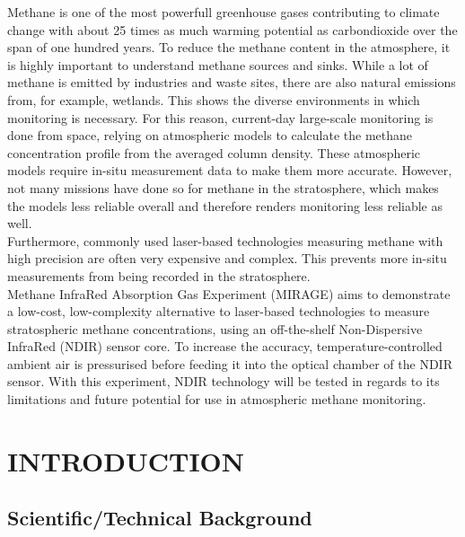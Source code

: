 \documentclass[
  a4paper,
  11pt,
  openany,
  parskip,
  toc=totoc,
  listof=totoc,
  bibliography=totoc
]{scrreprt}
\newcommand{\dos}{\textcolor{red}}
\begin{document}
Methane is one of the most powerfull greenhouse gases contributing to climate change with about 25 times as much warming potential as carbondioxide over the span of one hundred years. To reduce the methane content in the atmosphere, it is highly important to understand methane sources and sinks. While a lot of methane is emitted by industries and waste sites, there are also natural emissions from, for example, wetlands. This shows the diverse environments in which monitoring is necessary. For this reason, current-day large-scale monitoring is done from space, relying on atmospheric models to calculate the methane concentration profile from the averaged column density. These atmospheric models require in-situ measurement data to make them more accurate. However, not many missions have done so for methane in the stratosphere, which makes the models less reliable overall and therefore renders monitoring less reliable as well. \\
Furthermore, commonly used laser-based technologies measuring methane with high precision are often very expensive and complex. This prevents more in-situ measurements from being recorded in the stratosphere.\\  
Methane InfraRed Absorption Gas Experiment (MIRAGE) aims to demonstrate a low-cost, low-complexity alternative to laser-based technologies to measure stratospheric methane concentrations, using an off-the-shelf Non-Dispersive InfraRed (NDIR) sensor core. To increase the accuracy, temperature-controlled ambient air is pressurised before feeding it into the optical chamber of the NDIR sensor. With this experiment, NDIR technology will be tested in regards to its limitations and future potential for use in atmospheric methane monitoring.



\chapter{INTRODUCTION}
\label{sec:introduction}
\section{Scientific/Technical Background}
\end{document}
